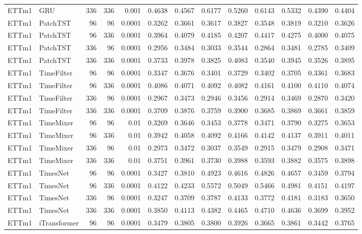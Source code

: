 \begin{longtable}{@{}llrrr*{8}{r}@{}}
ETTm1 & GRU & 336 & 336 & 0.001 & 0.4638 & 0.4567 & 0.6177 & 0.5260 & 0.6143 & 0.5332 & 0.4390 & 0.4404 \\
ETTm1 & PatchTST & 96 & 96 & 0.0001 & 0.3262 & 0.3661 & 0.3617 & 0.3827 & 0.3548 & 0.3819 & 0.3210 & 0.3626 \\
ETTm1 & PatchTST & 96 & 336 & 0.0001 & 0.3964 & 0.4079 & 0.4185 & 0.4207 & 0.4417 & 0.4275 & 0.4000 & 0.4075 \\
ETTm1 & PatchTST & 336 & 96 & 0.0001 & 0.2956 & 0.3484 & 0.3033 & 0.3544 & 0.2864 & 0.3481 & 0.2785 & 0.3409 \\
ETTm1 & PatchTST & 336 & 336 & 0.0001 & 0.3733 & 0.3978 & 0.3825 & 0.4083 & 0.3540 & 0.3945 & 0.3526 & 0.3895 \\
ETTm1 & TimeFilter & 96 & 96 & 0.0001 & 0.3347 & 0.3676 & 0.3401 & 0.3729 & 0.3402 & 0.3705 & 0.3361 & 0.3683 \\
ETTm1 & TimeFilter & 96 & 336 & 0.0001 & 0.4086 & 0.4071 & 0.4092 & 0.4082 & 0.4161 & 0.4100 & 0.4110 & 0.4074 \\
ETTm1 & TimeFilter & 336 & 96 & 0.0001 & 0.2967 & 0.3473 & 0.2946 & 0.3456 & 0.2914 & 0.3469 & 0.2870 & 0.3420 \\
ETTm1 & TimeFilter & 336 & 336 & 0.0001 & 0.3709 & 0.3876 & 0.3759 & 0.3900 & 0.3685 & 0.3869 & 0.3661 & 0.3859 \\
ETTm1 & TimeMixer & 96 & 96 & 0.01 & 0.3269 & 0.3646 & 0.3453 & 0.3778 & 0.3471 & 0.3790 & 0.3275 & 0.3653 \\
ETTm1 & TimeMixer & 96 & 336 & 0.01 & 0.3942 & 0.4058 & 0.4092 & 0.4166 & 0.4142 & 0.4137 & 0.3911 & 0.4011 \\
ETTm1 & TimeMixer & 336 & 96 & 0.01 & 0.2973 & 0.3472 & 0.3037 & 0.3549 & 0.2915 & 0.3479 & 0.2908 & 0.3471 \\
ETTm1 & TimeMixer & 336 & 336 & 0.01 & 0.3751 & 0.3961 & 0.3730 & 0.3988 & 0.3593 & 0.3882 & 0.3575 & 0.3898 \\
ETTm1 & TimesNet & 96 & 96 & 0.0001 & 0.3427 & 0.3810 & 0.4923 & 0.4616 & 0.4826 & 0.4657 & 0.3459 & 0.3794 \\
ETTm1 & TimesNet & 96 & 336 & 0.0001 & 0.4122 & 0.4233 & 0.5572 & 0.5049 & 0.5466 & 0.4981 & 0.4151 & 0.4197 \\
ETTm1 & TimesNet & 336 & 96 & 0.0001 & 0.3247 & 0.3709 & 0.3787 & 0.4133 & 0.3772 & 0.4181 & 0.3183 & 0.3650 \\
ETTm1 & TimesNet & 336 & 336 & 0.0001 & 0.3850 & 0.4113 & 0.4382 & 0.4465 & 0.4710 & 0.4636 & 0.3699 & 0.3952 \\
ETTm1 & iTransformer & 96 & 96 & 0.0001 & 0.3479 & 0.3805 & 0.3800 & 0.3926 & 0.3665 & 0.3861 & 0.3442 & 0.3765 \\

\end{longtable}
